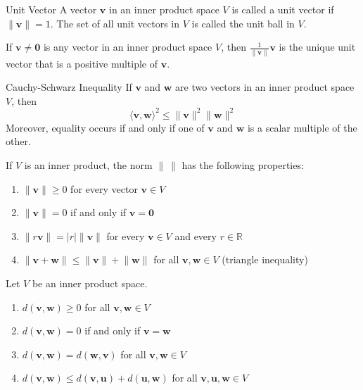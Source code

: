\documentclass[12pt]{article}
\begin{document}
\begin{definition}{Unit Vector}{}
    A vector $ \mathbf{v} $ in an inner product space $ V $ is called a unit vector if $ \lVert \mathbf{v} \rVert = 1 $. The set of all unit vectors in $ V $ is called the unit ball in $ V $.
\end{definition}

\begin{theorem}{}{}
    If $ \mathbf{v} \neq \mathbf{0} $ is any vector in an inner product space $ V $, then $ \frac{1}{\lVert \mathbf{v} \rVert} \mathbf{v} $ is the unique unit vector that is a positive multiple of $ \mathbf{v} $.
\end{theorem}

\begin{theorem}{Cauchy-Schwarz Inequality}{}
    If $ \mathbf{v} $ and $ \mathbf{w} $ are two vectors in an inner product space $ V $, then
    \[ \langle \mathbf{v}, \mathbf{w} \rangle^2 \leq \lVert \mathbf{v} \rVert^2 \lVert \mathbf{w} \rVert^2 \]
    Moreover, equality occurs if and only if one of $ \mathbf{v} $ and $ \mathbf{w} $ is a scalar multiple of the other.
\end{theorem}

\begin{theorem}{}{}
    If $ V $ is an inner product, the norm $ \lVert \ \rVert $ has the following properties:
    \begin{enumerate}[label=(\roman*)]
        \item $ \lVert \mathbf{v} \rVert \geq 0 $ for every vector $ \mathbf{v} \in V $
        \item $ \lVert \mathbf{v} \rVert = 0 $ if and only if $ \mathbf{v} = \mathbf{0} $
        \item $ \lVert r \mathbf{v} \rVert = \vert r \vert \lVert \mathbf{v} \rVert $ for every $ \mathbf{v} \in V $ and every $ r \in \mathbb{R} $
        \item $ \lVert \mathbf{v} + \mathbf{w} \rVert \leq \lVert \mathbf{v} \rVert + \lVert \mathbf{w} \rVert $ for all $ \mathbf{v}, \mathbf{w} \in V $ (triangle inequality)
    \end{enumerate}
\end{theorem}

\begin{theorem}{}{}
    Let $ V $ be an inner product space.
    \begin{enumerate}[label=(\roman*)]
        \item $ d \left( \mathbf{v}, \mathbf{w} \right) \geq 0 $ for all $ \mathbf{v}, \mathbf{w} \in V $
        \item $ d \left( \mathbf{v}, \mathbf{w} \right) = 0 $ if and only if $ \mathbf{v} = \mathbf{w} $
        \item $ d \left( \mathbf{v}, \mathbf{w} \right) = d \left( \mathbf{w}, \mathbf{v} \right) $ for all $ \mathbf{v}, \mathbf{w} \in V $
        \item $ d \left( \mathbf{v}, \mathbf{w} \right) \leq d \left( \mathbf{v}, \mathbf{u} \right) + d \left( \mathbf{u}, \mathbf{w} \right) $ for all $ \mathbf{v}, \mathbf{u}, \mathbf{w} \in V $
    \end{enumerate}
\end{theorem}
\end{document}
